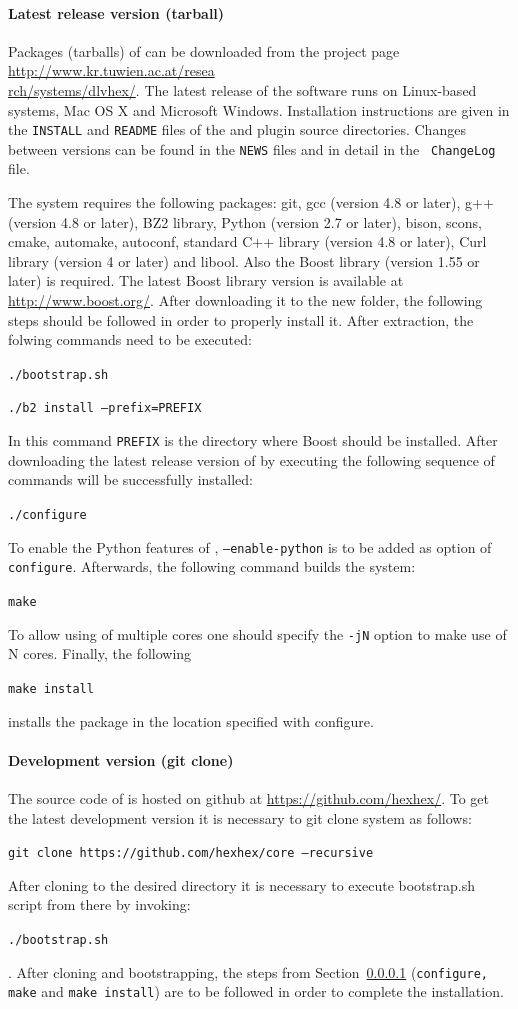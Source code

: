 \documentclass[a4paper, titlepage]{article}
\begin{document}
\paragraph{Latest release version (tarball)}
\label{sec:steps}
Packages (tarballs) of \dlvhex{} can be downloaded from the 
project page \url{http://www.kr.tuwien.ac.at/resea} \\ 
\url{rch/systems/dlvhex/}. The latest release of the 
software runs on Linux-based systems, Mac OS X and 
Microsoft Windows. Installation instructions are given in 
the {\tt INSTALL} and {\tt README} files of the \dlvhex{} 
and plugin source directories. Changes between versions can 
be found in the {\tt NEWS} files and in detail in the {\tt 
ChangeLog} file. 

The system requires the following packages: git, gcc 
(version 4.8 or later), g++ (version 4.8 or later), BZ2 
library, Python (version 2.7 or later), bison, scons, 
cmake, automake, autoconf, standard C++ library (version 
4.8 or later), Curl library (version 4 or later) and 
libool. Also the Boost library (version 1.55 or later) is 
required. The latest Boost library version is available at 
\url{http://www.boost.org/}. After downloading it to the 
new folder, the following steps should be followed in order 
to properly install it. After extraction, the folwing 
commands need to be executed:
\\ \centerline{\texttt{./bootstrap.sh}}
\centerline{\texttt{./b2 install --prefix=PREFIX}} In this 
command \texttt{PREFIX} is the directory where Boost should 
be installed. After downloading the latest release version of \dlvhex{} by 
executing the following sequence of commands \dlvhex{} will 
be successfully installed:
\\ \centerline{\texttt{./configure}} To enable the Python 
features of \dlvhex{}, \texttt{--enable-python} is to be 
added as option of \texttt{configure}. Afterwards, the 
following command builds the system:
\\ \centerline{\texttt{make}} To allow using of multiple 
cores one should specify the \texttt{-jN} option to make 
use of N cores. Finally, the following
\\ \centerline{\texttt{make install}} installs the package 
in the location specified with configure.  
   
\paragraph{Development version (git clone)}
The source code of \dlvhex{} is hosted on github at 
\url{https://github.com/hexhex/}. To get the latest 
development version it is necessary to git clone system as 
follows:
\\ \centerline{\texttt{git clone 
https://github.com/hexhex/core --recursive}} 
After cloning to the desired directory it is necessary to 
execute bootstrap.sh script from there by invoking: \\ 
\centerline{\texttt{./bootstrap.sh}}. 
After cloning and bootstrapping, the steps from 
Section~\ref{sec:steps} (\texttt{configure, make} and 
\texttt{make install}) are to be followed in order to 
complete the installation.
\end{document}
